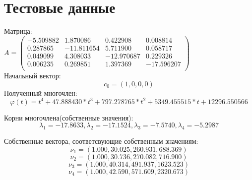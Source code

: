 \documentclass[a4paper,11pt]{article}
\begin{document}
 
\newpage
\part*{Тестовые данные}
Матрица:\\ 

$
A=\begin{pmatrix}
-5.509882 &      1.870086&        0.422908&        0.008814\\
0.287865&        -11.811654&      5.711900&       0.058717\\
0.049099&        4.308033&        -12.970687&      0.229326\\
0.006235&        0.269851&        1.397369&        -17.596207\\
\end{pmatrix}
$
 \\
Начальный вектор: 
\[c_0 = (1,0,0,0)\]
Полученный многочлен: 
\[\varphi(t) = t^4 +   47.888430*t^3 +  797.278765*t^2 + 5349.455515*t+12296.550566 \]

Корни многочлена(собственные значения): 
\[\lambda_1 = -17.8633, \lambda_2 = -17.1524, \lambda_3 = -7.5740, \lambda_4 = -5.2987 \]

Собственные вектора, соответсвующие собственным значениям: 
\[\nu_1 = (	1.000,  30.025,  260.931,  688.369  )\]
\[\nu_2 = (	1.000,  30.736,  270.082,  716.900  )\]
\[\nu_3 =(	1.000,  40.314 , 491.937,  1623.523  )\]
\[\nu_4 = (	1.000, 42.590,  571.609,  2320.673  )\]

 
\end{document}
